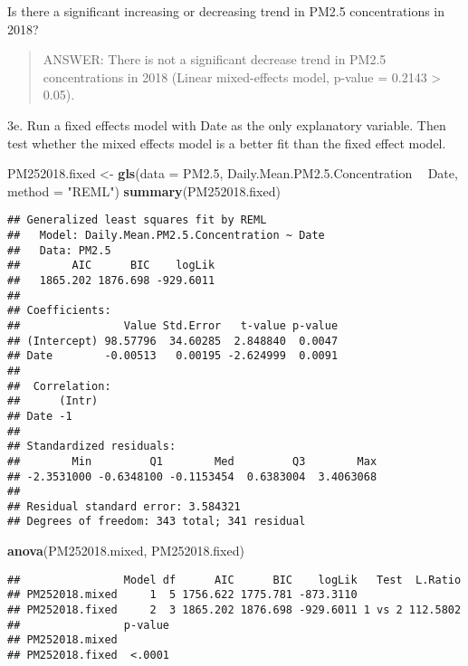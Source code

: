 \documentclass[]{article}
\newenvironment{Shaded}{\begin{snugshade}}{\end{snugshade}}
\newcommand{\KeywordTok}[1]{\textcolor[rgb]{0.13,0.29,0.53}{\textbf{#1}}}
\newcommand{\DataTypeTok}[1]{\textcolor[rgb]{0.13,0.29,0.53}{#1}}
\newcommand{\DecValTok}[1]{\textcolor[rgb]{0.00,0.00,0.81}{#1}}
\newcommand{\FloatTok}[1]{\textcolor[rgb]{0.00,0.00,0.81}{#1}}
\newcommand{\StringTok}[1]{\textcolor[rgb]{0.31,0.60,0.02}{#1}}
\newcommand{\OperatorTok}[1]{\textcolor[rgb]{0.81,0.36,0.00}{\textbf{#1}}}
\newcommand{\NormalTok}[1]{#1}
\begin{document}
Is there a significant increasing or decreasing trend in PM2.5
concentrations in 2018?

\begin{quote}
ANSWER: There is not a significant decrease trend in PM2.5
concentrations in 2018 (Linear mixed-effects model, p-value = 0.2143
\textgreater{} 0.05).
\end{quote}

3e. Run a fixed effects model with Date as the only explanatory
variable. Then test whether the mixed effects model is a better fit than
the fixed effect model.

\begin{Shaded}
\begin{Highlighting}[]
\NormalTok{PM252018.fixed <-}\StringTok{ }\KeywordTok{gls}\NormalTok{(}\DataTypeTok{data =}\NormalTok{ PM2.}\DecValTok{5}\NormalTok{, Daily.Mean.PM2.}\FloatTok{5.}\NormalTok{Concentration }\OperatorTok{~}\StringTok{ }\NormalTok{Date, }\DataTypeTok{method =} \StringTok{"REML"}\NormalTok{)}
\KeywordTok{summary}\NormalTok{(PM252018.fixed)}
\end{Highlighting}
\end{Shaded}

\begin{verbatim}
## Generalized least squares fit by REML
##   Model: Daily.Mean.PM2.5.Concentration ~ Date 
##   Data: PM2.5 
##        AIC      BIC    logLik
##   1865.202 1876.698 -929.6011
## 
## Coefficients:
##                Value Std.Error   t-value p-value
## (Intercept) 98.57796  34.60285  2.848840  0.0047
## Date        -0.00513   0.00195 -2.624999  0.0091
## 
##  Correlation: 
##      (Intr)
## Date -1    
## 
## Standardized residuals:
##        Min         Q1        Med         Q3        Max 
## -2.3531000 -0.6348100 -0.1153454  0.6383004  3.4063068 
## 
## Residual standard error: 3.584321 
## Degrees of freedom: 343 total; 341 residual
\end{verbatim}

\begin{Shaded}
\begin{Highlighting}[]
\KeywordTok{anova}\NormalTok{(PM252018.mixed, PM252018.fixed)}
\end{Highlighting}
\end{Shaded}

\begin{verbatim}
##                Model df      AIC      BIC    logLik   Test  L.Ratio
## PM252018.mixed     1  5 1756.622 1775.781 -873.3110                
## PM252018.fixed     2  3 1865.202 1876.698 -929.6011 1 vs 2 112.5802
##                p-value
## PM252018.mixed        
## PM252018.fixed  <.0001
\end{verbatim}
\end{document}
